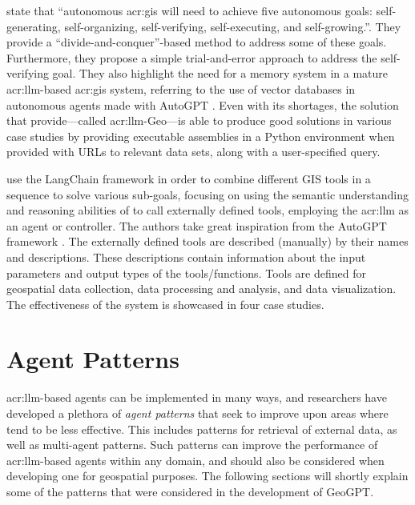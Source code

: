\cite{liAutonomousGISNextgeneration2023} state that \enquote{autonomous \acrshort{acr:gis} will need to achieve five autonomous goals: self-generating, self-organizing, self-verifying, self-executing, and self-growing.}. They provide a \enquote{divide-and-conquer}-based method to address some of these goals. Furthermore, they propose a simple trial-and-error approach to address the self-verifying goal. They also highlight the need for a memory system in a mature \acrshort{acr:llm}-based \acrshort{acr:gis} system, referring to the use of vector databases in autonomous agents made with AutoGPT \citep{richardAutoGPTHeartOpensource2023}. Even with its shortages, the solution that \cite{liAutonomousGISNextgeneration2023} provide---called \acrshort{acr:llm}-Geo---is able to produce good solutions in various case studies by providing executable assemblies in a Python environment when provided with URLs to relevant data sets, along with a user-specified query.

\cite{zhangGeoGPTUnderstandingProcessing2023} use the LangChain framework in order to combine different GIS tools in a sequence to solve various sub-goals, focusing on using the semantic understanding and reasoning abilities of  to call externally defined tools, employing the \acrshort{acr:llm} as an agent or controller. The authors take great inspiration from the AutoGPT framework \citep{richardAutoGPTHeartOpensource2023}. The externally defined tools are described (manually) by their names and descriptions. These descriptions contain information about the input parameters and output types of the tools/functions. Tools are defined for geospatial data collection, data processing and analysis, and data visualization. The effectiveness of the system is showcased in four case studies.


\section{Agent Patterns}
\label{sec:agent-patterns}

\acrshort{acr:llm}-based agents can be implemented in many ways, and researchers have developed a plethora of \textit{agent patterns} that seek to improve upon areas where  tend to be less effective. This includes patterns for retrieval of external data, as well as multi-agent patterns. Such patterns can improve the performance of \acrshort{acr:llm}-based agents within any domain, and should also be considered when developing one for geospatial purposes. The following sections will shortly explain some of the patterns that were considered in the development of GeoGPT.

